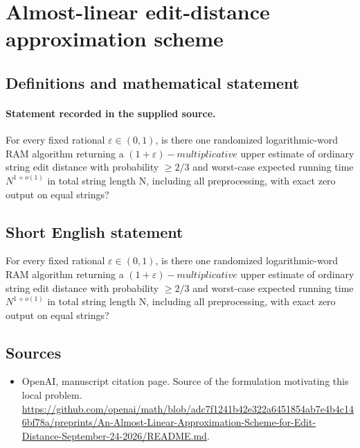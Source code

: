 \documentclass[11pt]{article}
\begin{document}
\section*{Almost-linear edit-distance approximation scheme}\label{statement}
\subsection{Definitions and mathematical statement}
\paragraph{Statement recorded in the supplied source.}
For every fixed rational $\varepsilon \in (0,1)$, is there one randomized logarithmic-word RAM algorithm returning a $(1+\varepsilon )-multiplicative$ upper estimate of ordinary string edit distance with probability $\geq 2/3$ and worst-case expected running time $N^{1+o(1)}$ in total string length N, including all preprocessing, with exact zero output on equal strings?
\subsection{Short English statement}
For every fixed rational $\varepsilon \in (0,1)$, is there one randomized logarithmic-word RAM algorithm returning a $(1+\varepsilon )-multiplicative$ upper estimate of ordinary string edit distance with probability $\geq 2/3$ and worst-case expected running time $N^{1+o(1)}$ in total string length N, including all preprocessing, with exact zero output on equal strings?
\subsection{Sources}
\begin{itemize}
\item[S1] OpenAI, manuscript citation page. Source of the formulation motivating this local problem.
\url{https://github.com/openai/math/blob/adc7f1241b42e322a6451854ab7e4b4c146bf78a/preprints/An-Almost-Linear-Approximation-Scheme-for-Edit-Distance-September-24-2026/README.md}.
\end{itemize}
\end{document}
